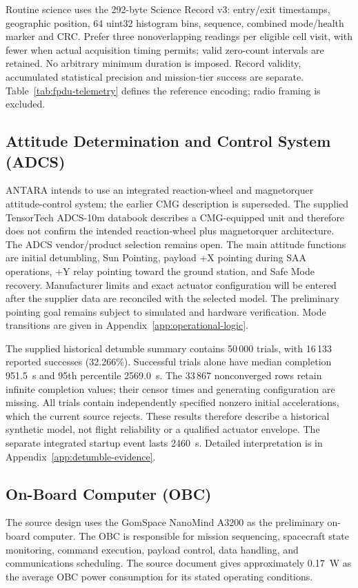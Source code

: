 Routine science uses the 292-byte Science Record v3: entry/exit timestamps, geographic position, 64 uint32 histogram bins, sequence, combined mode/health marker and CRC. Prefer three nonoverlapping readings per eligible cell visit, with fewer when actual acquisition timing permits; valid zero-count intervals are retained. No arbitrary minimum duration is imposed. Record validity, accumulated statistical precision and mission-tier success are separate. Table~\ref{tab:fpdu-telemetry} defines the reference encoding; radio framing is excluded.

\subsection{Attitude Determination and Control System (ADCS)}\label{attitude-determination-and-control-system-adcs}
ANTARA intends to use an integrated reaction-wheel and magnetorquer attitude-control system; the earlier CMG description is superseded. The supplied TensorTech ADCS-10m databook describes a CMG-equipped unit and therefore does not confirm the intended reaction-wheel plus magnetorquer architecture. The ADCS vendor/product selection remains open. The main attitude functions are initial detumbling, Sun Pointing, payload +X pointing during SAA operations, +Y relay pointing toward the ground station, and Safe Mode recovery. Manufacturer limits and exact actuator configuration will be entered after the supplier data are reconciled with the selected model. The preliminary pointing goal remains subject to simulated and hardware verification. Mode transitions are given in Appendix~\ref{app:operational-logic}.

The supplied historical detumble summary contains 50\,000 trials, with 16\,133 reported successes (32.266\%). Successful trials alone have median completion 951.5~s and 95th percentile 2569.0~s. The 33\,867 nonconverged rows retain infinite completion values; their censor times and generating configuration are missing. All trials contain independently specified nonzero initial accelerations, which the current source rejects. These results therefore describe a historical synthetic model, not flight reliability or a qualified actuator envelope. The separate integrated startup event lasts 2460~s. Detailed interpretation is in Appendix~\ref{app:detumble-evidence}.

\subsection{On-Board Computer (OBC)}\label{on-board-computer-obc}
The source design uses the GomSpace NanoMind A3200 as the preliminary on-board computer. The OBC is responsible for mission sequencing, spacecraft state monitoring, command execution, payload control, data handling, and communications scheduling. The source document gives approximately 0.17~W as the average OBC power consumption for its stated operating conditions.

